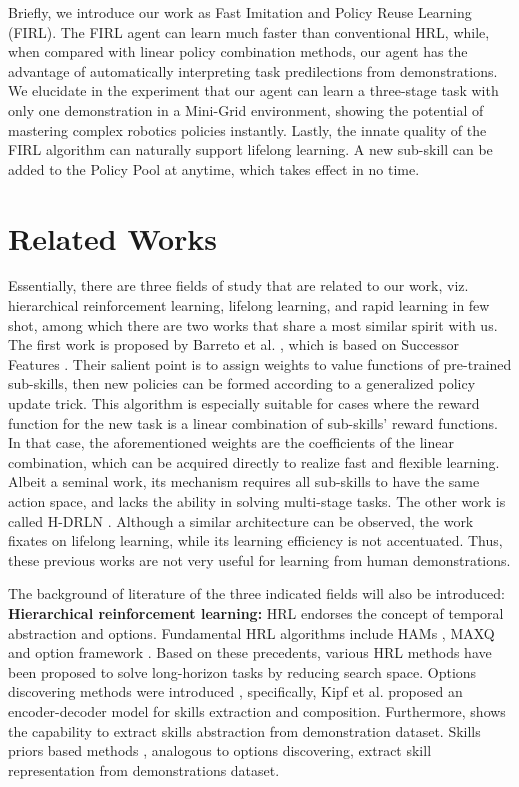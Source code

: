\documentclass[conference]{IEEEtran}
\begin{document}
Briefly, we introduce our work as Fast Imitation and Policy Reuse Learning (FIRL).
The FIRL agent can learn much faster than conventional HRL, while, when compared with linear policy combination methods, our agent has the advantage of automatically interpreting task predilections from demonstrations. We elucidate in the experiment that our agent can learn a three-stage task with only one demonstration in a Mini-Grid environment, showing the potential of mastering complex robotics policies instantly. Lastly, the innate quality of the FIRL algorithm can naturally support lifelong learning. A new sub-skill can be added to the Policy Pool at anytime, which takes effect in no time.

\section{Related Works}
Essentially, there are three fields of study that are related to our work, viz. hierarchical reinforcement learning, lifelong learning, and rapid learning in few shot, among which there are two works that share a most similar spirit with us. The first work is proposed by Barreto et al. \cite{barreto2019option,barreto2020fast}, which is based on Successor Features \cite{barreto2017successor}. Their salient point is to assign weights to value functions of pre-trained sub-skills, then new policies can be formed according to a generalized policy update trick. This algorithm is especially suitable for cases where the reward function for the new task is a linear combination of sub-skills' reward functions. In that case, the aforementioned weights are the coefficients of the linear combination, which can be acquired directly to realize fast and flexible learning. Albeit a seminal work, its mechanism requires all sub-skills to have the same action space, and lacks the ability in solving multi-stage tasks. The other work is called H-DRLN \cite{tessler2017deep}. Although a similar architecture can be observed, the work fixates on lifelong learning, while its learning efficiency is not accentuated. Thus, these previous works are not very useful for learning from human demonstrations.

The background of literature of the three indicated fields will also be introduced: \textbf{Hierarchical reinforcement learning:}
HRL endorses the concept of temporal abstraction and options. Fundamental HRL algorithms include HAMs \cite{parr1997reinforcement}, MAXQ \cite{dietterich1998maxq,dietterich2000hierarchical} and option framework \cite{sutton1999between}. Based on these precedents, various HRL methods \cite{kulkarni2016hierarchical,nachum2018data} have been proposed to solve long-horizon tasks by reducing search space. Options discovering methods were introduced \cite{krishnan2017ddco,fox2017multi}, specifically, Kipf et al. \cite{kipf2019compile} proposed
an encoder-decoder model for skills extraction and composition. Furthermore, \cite{gupta2019relay} shows the capability to extract skills abstraction from demonstration dataset. Skills priors based methods \cite{hakhamaneshi2021hierarchical,hausman2018learning,pertsch2020accelerating}, analogous to options discovering, extract skill representation from demonstrations dataset. 
\end{document}

